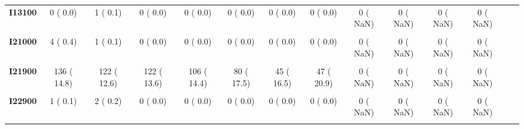 \documentclass[
]{article}
\begin{document}
\begin{table}[H]
\begin{tabular}[t]{>{\raggedright\arraybackslash}p{5em}ccccccccccccc}
\textbf{I13100} & 0 (  0.0) & 1 (  0.1) & 0 (  0.0) & 0 (  0.0) & 0 (  0.0) & 0 (  0.0) & 0 (  0.0) & 0 (  NaN) & 0 (  NaN) & 0 (  NaN) & 0 (  NaN) &  & \\
\textbf{\cellcolor{gray!10}{I20000}} & \cellcolor{gray!10}{0 (  0.0)} & \cellcolor{gray!10}{0 (  0.0)} & \cellcolor{gray!10}{1 (  0.1)} & \cellcolor{gray!10}{1 (  0.1)} & \cellcolor{gray!10}{0 (  0.0)} & \cellcolor{gray!10}{0 (  0.0)} & \cellcolor{gray!10}{0 (  0.0)} & \cellcolor{gray!10}{0 (  NaN)} & \cellcolor{gray!10}{0 (  NaN)} & \cellcolor{gray!10}{0 (  NaN)} & \cellcolor{gray!10}{0 (  NaN)} & \cellcolor{gray!10}{} & \cellcolor{gray!10}{}\\
\textbf{I21000} & 4 (  0.4) & 1 (  0.1) & 0 (  0.0) & 0 (  0.0) & 0 (  0.0) & 0 (  0.0) & 0 (  0.0) & 0 (  NaN) & 0 (  NaN) & 0 (  NaN) & 0 (  NaN) &  & \\
\textbf{\cellcolor{gray!10}{I21100}} & \cellcolor{gray!10}{2 (  0.2)} & \cellcolor{gray!10}{0 (  0.0)} & \cellcolor{gray!10}{0 (  0.0)} & \cellcolor{gray!10}{0 (  0.0)} & \cellcolor{gray!10}{0 (  0.0)} & \cellcolor{gray!10}{0 (  0.0)} & \cellcolor{gray!10}{0 (  0.0)} & \cellcolor{gray!10}{0 (  NaN)} & \cellcolor{gray!10}{0 (  NaN)} & \cellcolor{gray!10}{0 (  NaN)} & \cellcolor{gray!10}{0 (  NaN)} & \cellcolor{gray!10}{} & \cellcolor{gray!10}{}\\
\textbf{I21900} & 136 ( 14.8) & 122 ( 12.6) & 122 ( 13.6) & 106 ( 14.4) & 80 ( 17.5) & 45 ( 16.5) & 47 ( 20.9) & 0 (  NaN) & 0 (  NaN) & 0 (  NaN) & 0 (  NaN) &  & \\
\textbf{\cellcolor{gray!10}{I22000}} & \cellcolor{gray!10}{0 (  0.0)} & \cellcolor{gray!10}{0 (  0.0)} & \cellcolor{gray!10}{0 (  0.0)} & \cellcolor{gray!10}{2 (  0.3)} & \cellcolor{gray!10}{0 (  0.0)} & \cellcolor{gray!10}{0 (  0.0)} & \cellcolor{gray!10}{0 (  0.0)} & \cellcolor{gray!10}{0 (  NaN)} & \cellcolor{gray!10}{0 (  NaN)} & \cellcolor{gray!10}{0 (  NaN)} & \cellcolor{gray!10}{0 (  NaN)} & \cellcolor{gray!10}{} & \cellcolor{gray!10}{}\\
\textbf{I22900} & 1 (  0.1) & 2 (  0.2) & 0 (  0.0) & 0 (  0.0) & 0 (  0.0) & 0 (  0.0) & 0 (  0.0) & 0 (  NaN) & 0 (  NaN) & 0 (  NaN) & 0 (  NaN) &  & \\
\textbf{\cellcolor{gray!10}{I24800}} & \cellcolor{gray!10}{3 (  0.3)} & \cellcolor{gray!10}{9 (  0.9)} & \cellcolor{gray!10}{1 (  0.1)} & \cellcolor{gray!10}{5 (  0.7)} & \cellcolor{gray!10}{5 (  1.1)} & \cellcolor{gray!10}{0 (  0.0)} & \cellcolor{gray!10}{2 (  0.9)} & \cellcolor{gray!10}{0 (  NaN)} & \cellcolor{gray!10}{0 (  NaN)} & \cellcolor{gray!10}{0 (  NaN)} & \cellcolor{gray!10}{0 (  NaN)} & \cellcolor{gray!10}{} & \cellcolor{gray!10}{}\\

\end{tabular}
\end{table}
\end{document}
